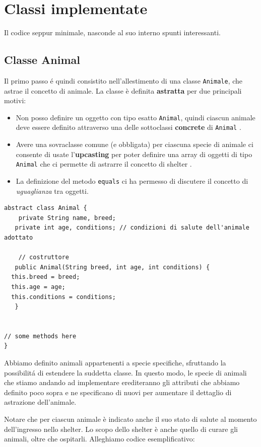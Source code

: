 \documentclass[a4paper,11pt]{article}
\begin{document}
\section{Classi implementate}
Il codice seppur minimale, nasconde al suo interno spunti interessanti.


\subsection{Classe Animal}

Il primo passo \'e quindi consistito nell'allestimento di una classe {\tt Animale}, che astrae il concetto di animale. La classe è definita \textbf{astratta} per due principali motivi:
\begin{itemize}
    \item Non posso definire un oggetto con tipo esatto {\tt Animal}, quindi ciascun animale deve essere definito attraverso una delle sottoclassi \textbf{concrete} di {\tt Animal} \cite{java}.
    \item Avere una sovraclasse comune (e obbligata) per ciascuna specie di animale ci consente di usate l'\textbf{upcasting} per poter definire una array di oggetti di tipo {\tt Animal} che ci permette di astrarre il concetto di shelter \cite{java_book}.
    \item La definizione del metodo {\tt equals} ci ha permesso di discutere il concetto di {\em uguaglianza} tra oggetti.
\end{itemize}

\begin{lstlisting}[caption={Animal.java -- Allestimento della classe Animale}]
abstract class Animal {
 	private String name, breed;
   private int age, conditions; // condizioni di salute dell'animale adottato

	// costruttore
   public Animal(String breed, int age, int conditions) {
  this.breed = breed;
  this.age = age;
  this.conditions = conditions;
   }


// some methods here 
}

\end{lstlisting}

Abbiamo definito animali appartenenti a specie specifiche, sfruttando la possibilit\'a di estendere la suddetta classe. In questo modo, le specie di animali che stiamo andando ad implementare erediteranno gli attributi che abbiamo definito poco sopra e ne specificano di nuovi per aumentare il dettaglio di astrazione dell'animale.

Notare che per ciascun animale è indicato anche il suo stato di salute al momento dell'ingresso nello shelter. Lo scopo dello shelter è anche quello di curare gli animali, oltre che ospitarli. Alleghiamo codice esemplificativo:
\end{document}
